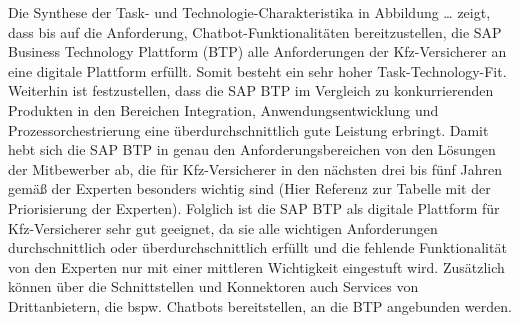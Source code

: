 Die Synthese der Task- und Technologie-Charakteristika in Abbildung … zeigt, dass bis auf die Anforderung, Chatbot-Funktionalitäten bereitzustellen, die SAP Business Technology Plattform (BTP) alle Anforderungen der Kfz-Versicherer an eine digitale Plattform erfüllt. Somit besteht ein sehr hoher Task-Technology-Fit. Weiterhin ist festzustellen, dass die SAP BTP im Vergleich zu konkurrierenden Produkten in den Bereichen Integration, Anwendungsentwicklung und Prozessorchestrierung eine überdurchschnittlich gute Leistung erbringt. Damit hebt sich die SAP BTP in genau den Anforderungsbereichen von den Lösungen der Mitbewerber ab, die für Kfz-Versicherer in den nächsten drei bis fünf Jahren gemäß der Experten besonders wichtig sind (Hier Referenz zur Tabelle mit der Priorisierung der Experten). Folglich ist die SAP BTP als digitale Plattform für Kfz-Versicherer sehr gut geeignet, da sie alle wichtigen Anforderungen durchschnittlich oder überdurchschnittlich erfüllt und die fehlende Funktionalität von den Experten nur mit einer mittleren Wichtigkeit eingestuft wird. Zusätzlich können über die Schnittstellen und Konnektoren auch Services von Drittanbietern, die bspw. Chatbots bereitstellen, an die BTP angebunden werden.




\newpage